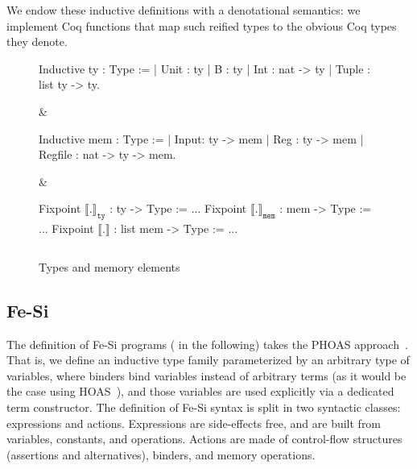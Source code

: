 \documentclass{llncs}
\newcommand{\denote}[1]{\llbracket #1 \rrbracket}
\newcommand{\denotety}[1]{\denote{\mathtt{#1}}_{\mathtt{ty}}}
\newcommand{\denotemem}[1]{\denote{\mathtt{#1}}_{\mathtt{mem}}}
\begin{document}
We endow these inductive definitions with a denotational semantics: we
implement Coq functions that map such reified types to the obvious Coq
types they denote.

\begin{figure}
  \centering
\begin{threelistings}
\begin{coq}
Inductive ty : Type :=
| Unit : ty 
| B : ty 
| Int : nat -> ty
| Tuple : list ty -> ty.     
\end{coq}&
\begin{coq}
Inductive mem : Type :=
| Input: ty ->  mem
| Reg : ty -> mem
| Regfile : nat -> ty -> mem. 
$ $
\end{coq}
&
\begin{coq}
Fixpoint $\denotety{.}$ : ty -> Type := ...
Fixpoint $\denotemem{.}$ : mem -> Type := ...
Fixpoint $\denote{.}$ : list mem -> Type := ...

$ $
\end{coq}
\end{threelistings}
\caption{Types and memory elements}
  \label{fig:type}
\end{figure}




\subsection{Fe-Si}
The definition of Fe-Si programs ( in the following)
takes the PHOAS approach~\cite{phoas-chlipala}. 
%
That is, we define an inductive type family parameterized by an
arbitrary type  of variables, where binders bind variables
instead of arbitrary terms (as it would be the case using
HOAS~\cite{DBLP:conf/pldi/PfenningE88}), and those variables are used
explicitly via a dedicated term constructor.
%
The definition of Fe-Si syntax is split in two syntactic classes:
expressions and actions. 
%
Expressions are side-effects free, and are built from variables,
constants, and operations.
%
Actions are made of control-flow structures (assertions and
alternatives), binders, and memory operations. 
\end{document}
